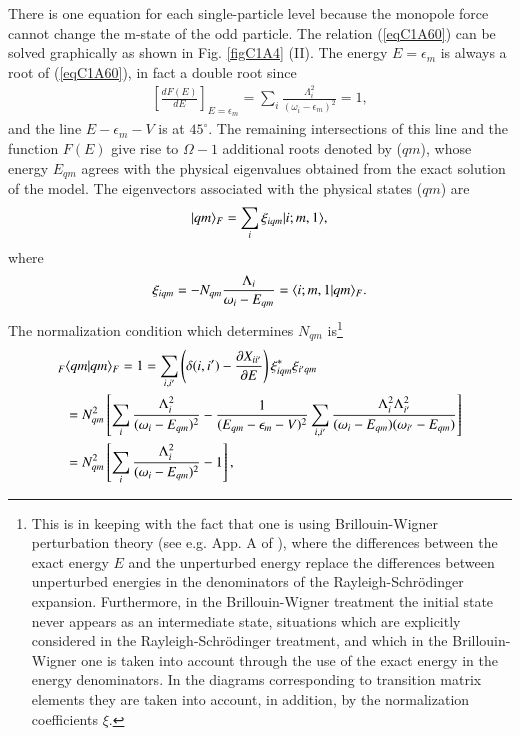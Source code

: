  There is one equation for each single-particle level because the monopole force cannot change the m-state of the odd particle. The relation (\ref{eqC1A60}) can be solved graphically as shown in Fig. \ref{figC1A4} (II). The energy $E =\epsilon_m$ is always a root of (\ref{eqC1A60}), in fact a double root since 
  \begin{align}\label{eqC1A61} 
 \left[\frac{dF(E)}{dE}\right]_{E=\epsilon_m}=\sum_i\frac{\Lambda^2_i}{\left(\omega_i-\epsilon_m\right)^2}=1,
  \end{align}
and the line $E-\epsilon_m-V$ is at $45^\circ$. The remaining intersections of this line and the function $F(E)$ give rise to $\Omega-1$ additional roots denoted by ($qm$), whose energy $E_{qm}$ agrees with the physical eigenvalues obtained from the exact solution of the model. 
The eigenvectors associated with the physical states ($qm$) are 
  \begin{align}\label{eqC1A62} 
 |{qm} \rangle_F=\sum_i\xi_{iqm}|{i;m,1} \rangle,
  \end{align}
where 
  \begin{align}\label{eqC1A63} 
 \xi_{iqm}=-N_{qm}\frac{\Lambda_i}{\omega_i-E_{qm}}=\langle {i;m,1|qm} \rangle_F.
  \end{align}
The normalization condition which determines $N_{qm}$ is\footnote{This is in keeping with the fact that one is using Brillouin-Wigner perturbation theory (see e.g. App. A of \cite{Bes:76a}), where the differences between the exact energy $E$ and the unperturbed energy replace the differences between unperturbed energies in the denominators of the Rayleigh-Schr\"odinger expansion. Furthermore, in the Brillouin-Wigner treatment the initial state never appears as an intermediate state, situations which are explicitly considered in the Rayleigh-Schr\"odinger treatment, and which in the Brillouin-Wigner one is taken into account through the use of the exact energy in the energy denominators. In the diagrams corresponding to transition matrix elements they are taken into account, in addition, by the normalization coefficients $\xi$.} 
  \begin{align}\label{eqC1A64} 
\nonumber _F&\langle {qm|qm} \rangle_F=1=\sum_{i,i'}\left(\delta(i,i')-\frac{\partial X_{ii'}}{\partial E}\right)\xi^*_{iqm}\xi_{i'qm}\\
\nonumber &=N^2_{qm}\left[\sum_i\frac{\Lambda^2_i}{(\omega_i-E_{qm})^2}-\frac{1}{(E_{qm}-\epsilon_m-V)^2}\sum_{i,i'}\frac{\Lambda^2_i\Lambda^2_{i'}}{(\omega_i-E_{qm})(\omega_{i'}-E_{qm})}\right]\\
 &=N^2_{qm}\left[\sum_i\frac{\Lambda_i^2}{(\omega_i-E_{qm})^2}-1\right],
  \end{align}
